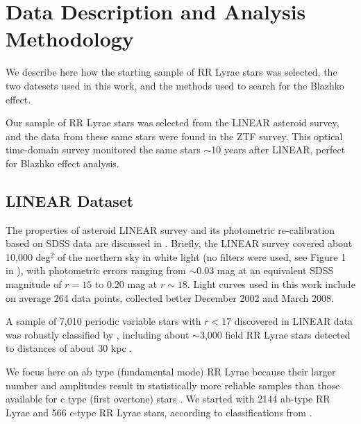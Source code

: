 

\section{Data Description and Analysis Methodology\label{sec:analysis}}

We describe here how the starting sample of RR Lyrae stars was selected, the two datesets used in this work,
and the methods used to search for the Blazhko effect.

Our sample of RR Lyrae stars was selected from the LINEAR asteroid survey, and the data from these same stars were found
in the ZTF survey. This optical time-domain survey monitored the same stars $\sim$10 years after LINEAR, perfect for Blazhko effect analysis. 


\subsection{LINEAR Dataset}

The properties of asteroid LINEAR survey and its photometric re-calibration based on SDSS data are discussed in \cite{2011AJ....142..190S}.
Briefly, the LINEAR survey covered about 10,000 deg$^2$ of the northern sky in white light (no filters were used, see Figure 1 in \citealt{2011AJ....142..190S}),
with photometric errors ranging from $\sim$0.03 mag at an equivalent SDSS magnitude of $r=15$ to 0.20 mag at $r\sim18$. Light curves used
in this work include on average 264 data points, collected better December 2002 and March 2008.
 
A sample of 7,010 periodic variable stars with $r<17$ discovered in LINEAR data was robustly classified by \cite{2013AJ....146..101P}, including
about $\sim$3,000 field RR Lyrae stars detected to distances of about 30 kpc \citep{2013AJ....146...21S}. 

We focus here on ab type (fundamental mode) RR Lyrae because their larger number and amplitudes result in statistically
more reliable samples than those available for c type (first overtone) stars \cite{2016CoKon.105...61K}.
We started with 2144 ab-type RR Lyrae and 566 c-type RR Lyrae stars, according to classifications from \cite{2013AJ....146..101P}. 

